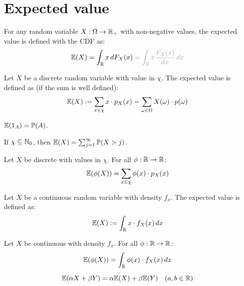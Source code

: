 \section{Expected value}

For any random variable \(X: \Omega \to \mathbb{R}_+\) with non-negative values, the expected value is defined with the CDF as:
\vspace{-8pt}
\[\E(X) = \int_\R x \,dF_X(x) \color{gray!70} = \int_\R x \frac{F_X(x)}{dx} \, dx\]

\begin{ddefinition*}
  Let \(X\) be a discrete random variable with value in \(\chi\). The expected value is defined as (if the sum is well defined):
  \vspace{-10pt}
  \[\mathbb{E}(X) := \sum_{x \in \chi}x \cdot p_X(x) = \sum_{\omega \in \Omega} X(\omega) \cdot p(\omega)\]
\end{ddefinition*}

\begin{proposition}
  {\small \(\mathbb{E}(1_A) = \mathbb{P}(A)\)}.
\end{proposition}

\begin{proposition}
  If \(\chi \subseteq \mathbb{N}_0\), then \(\mathbb{E}(X) = \sum_{j=1}^\infty \mathbb{P}(X > j)\).
\end{proposition}

\begin{dtheorem*}
  Let \(X\) be discrete with values in \(\chi\). For all \(\phi: \mathbb{R} \to \mathbb{R}\):
  \[\mathbb{E}(\phi(X)) = \sum_{x \in \chi}\phi(x) \cdot p_X(x)\]
\end{dtheorem*}

\begin{cdefinition*}
  Let \(X\) be a continuous random variable with density \(f_x\). The expected value is defined as:
  \vspace{-10pt}
  \[\mathbb{E}(X) := \int_{\mathbb{R}} x \cdot f_X(x) \,dx\]
\end{cdefinition*}

\begin{ctheorem*}
  Let \(X\) be continuous with density \(f_x\). For all \(\phi: \mathbb{R} \to \mathbb{R}\):
  \[\mathbb{E}(\phi(X)) = \int_{\mathbb{R}} \phi(x) \cdot f_X(x) \, dx\]
\end{ctheorem*}

\begin{theorem*}
  \[\mathbb{E}(\alpha X + \beta Y) = \alpha \mathbb{E}(X) + \beta \mathbb{E}(Y) \quad (a, b \in \mathbb{R})\]
\end{theorem*}

